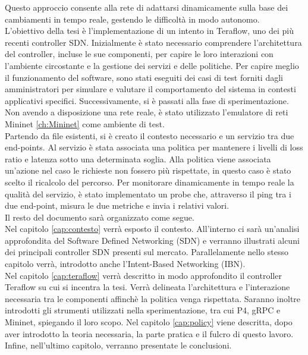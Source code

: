 Questo approccio consente alla rete di adattarsi dinamicamente sulla base dei cambiamenti in tempo reale, gestendo le difficoltà in modo autonomo.
\\L'obiettivo della tesi è l'implementazione di un intento in Teraflow, uno dei più recenti controller SDN.
Inizialmente è stato necessario comprendere l'architettura del controller, incluse le sue componenti, per capire le loro interazioni con l'ambiente circostante e la gestione dei servizi e delle politiche.
Per capire meglio il funzionamento del software, sono stati eseguiti dei casi di test forniti dagli amministratori per simulare e valutare il comportamento del sistema in contesti applicativi specifici.
Successivamente, si è passati alla fase di sperimentazione.
Non avendo a disposizione una rete reale, è stato utilizzato l'emulatore di reti Mininet \ref{ch:Mininet} come ambiente di test.
\\Partendo da file esistenti, si è creato il contesto necessario e un servizio tra due end-points.
Al servizio è stata associata una politica per mantenere i livelli di loss ratio e latenza sotto una determinata soglia.
Alla politica viene associata un'azione nel caso le richieste non fossero più rispettate, in questo caso è stato scelto il ricalcolo del percorso.
Per monitorare dinamicamente in tempo reale la qualità del servizio, è stato implementato un probe che, attraverso il ping tra i due end-point, misura le due metriche e invia 
i relativi valori.
\\Il resto del documento sarà organizzato come segue.
\\Nel capitolo \ref{cap:contesto} verrà esposto il contesto. All'interno ci sarà un'analisi approfondita del Software Defined Networking (SDN)
e verranno illustrati alcuni dei principali controller SDN presenti sul mercato. Parallelamente nello stesso capitolo verrà, introdotto anche l'Intent-Based Networking (IBN).
\\Nel capitolo \ref{cap:teraflow} verrà descritto in modo approfondito il controller Teraflow su cui si incentra la tesi.
Verrà delineata l'architettura e l'interazione necessaria tra le componenti affinchè la politica venga rispettata.
Saranno inoltre introdotti gli strumenti utilizzati nella sperimentazione, tra cui P4, gRPC e Mininet, spiegando il loro scopo.
Nel capitolo \ref{cap:policy} viene descritta, dopo aver introdotto la teoria necessaria, la parte pratica e il fulcro di questo lavoro.
Infine, nell’ultimo capitolo, verranno presentate le conclusioni.
